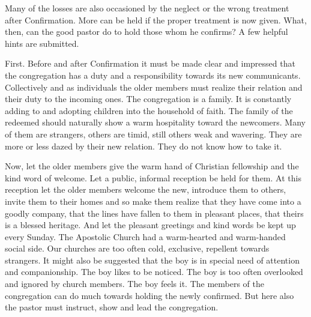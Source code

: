 Many of the losses are also occasioned by the neglect or the wrong treatment after Confirmation. More can be held if the proper treatment is now given. What, then, can the good pastor do to hold those whom he confirms? A few helpful hints are submitted. 

First. Before and after Confirmation it must be made clear and impressed that the congregation has a duty and a responsibility towards its new communicants.  Collectively and as individuals the older members must realize their relation and their duty to the incoming ones. The congregation is a family. It is constantly adding to and adopting children into the household of faith. The family of the redeemed should naturally show a warm hospitality toward the newcomers. Many of them are strangers, others are timid, still others weak and wavering. They are more or less dazed by their new relation. They do not know how to take it.

Now, let the older members give the warm hand of Christian fellowship and the kind word of welcome. Let a public, informal reception be held for them. At this reception let the older members welcome the new, introduce them to others, invite them to their homes and so make them realize that they have come into a goodly company, that the lines have fallen to them in pleasant places, that theirs is a blessed heritage. And let the pleasant greetings and kind words be kept up every Sunday. The Apostolic Church had a warm-hearted and warm-handed social side. Our churches are too often cold, exclusive, repellent towards strangers. It might also be suggested that the boy is in special need of attention and companionship. The boy likes to be noticed. The boy is too often overlooked and ignored by church members. The boy feels it. The members of the congregation can do much towards holding the newly confirmed. But here also the pastor must instruct, show and lead the congregation. 

